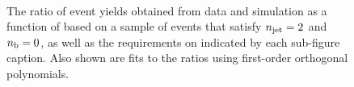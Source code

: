 \begin{figure}[h!]
\begin{center}
    \\
    \caption{The ratio of event yields obtained from data and simulation as a function of \mht [GeV] based on a sample of \mj events that satisfy $n_{\text{jet}} = 2$ and $n_{\text{b}} = 0$, as well as the requirements on \scalht indicated by each sub-figure caption. Also shown are fits to the ratios using first-order orthogonal polynomials.}
    \label{fig:mhtval_Mu_eq2j_eq0b}
  \end{center}
\end{figure}


